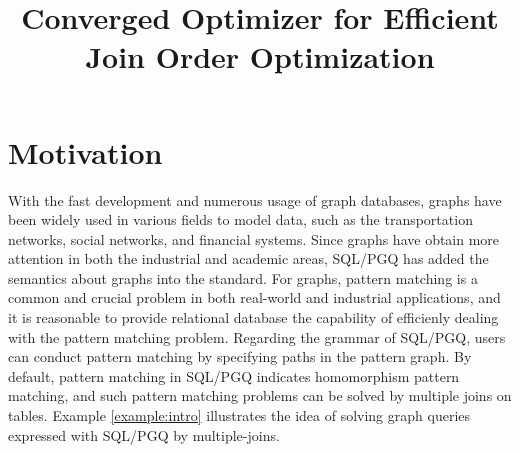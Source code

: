 \documentclass[sigconf, nonacm]{acmart}
\begin{document}
\title{Converged Optimizer for Efficient Join Order Optimization}



\begin{abstract}

\end{abstract}

\maketitle

\section{Motivation}
\label{sec:motivation}
With the fast development and numerous usage of graph databases, graphs have been widely used in various fields to model data, such as the transportation networks, social networks, and financial systems.
Since graphs have obtain more attention in both the industrial and academic areas, SQL/PGQ has added the semantics about graphs into the standard.
For graphs, pattern matching is a common and crucial problem in both real-world and industrial applications, and it is reasonable to provide relational database the capability of efficienly dealing with the pattern matching problem.
Regarding the grammar of SQL/PGQ, users can conduct pattern matching by specifying paths in the pattern graph.
By default, pattern matching in SQL/PGQ indicates homomorphism pattern matching, and such pattern matching problems can be solved by multiple joins on tables.
Example \ref{example:intro} illustrates the idea of solving graph queries expressed with SQL/PGQ by multiple-joins.
\end{document}
